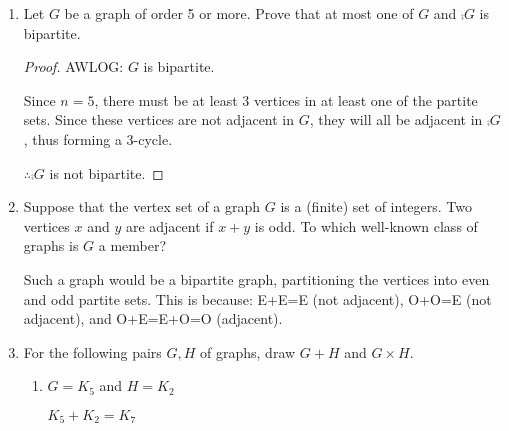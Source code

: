 \documentclass[letterpaper,12pt,fleqn]{article}
\begin{document}
\begin{enumerate}[start=21]
\item Let \(G\) be a graph of order 5 or more.  Prove that at most one of \(G\) and \(\comp{G}\) is bipartite.

  \begin{proof}
    AWLOG: \(G\) is bipartite.

    Since \(n=5\), there must be at least 3 vertices in at least one of the partite sets.  Since these vertices are
    not adjacent in \(G\), they will all be adjacent in \(\comp{G}\), thus forming a 3-cycle.

    \(\therefore\comp{G}\) is not bipartite.
  \end{proof}
  
\item Suppose that the vertex set of a graph \(G\) is a (finite) set of integers.  Two vertices \(x\) and \(y\) are
  adjacent if \(x+y\) is odd.  To which well-known class of graphs is \(G\) a member?

  Such a graph would be a bipartite graph, partitioning the vertices into even and odd partite sets.  This is
  because: E+E=E (not adjacent), O+O=E (not adjacent), and O+E=E+O=O (adjacent).

\item For the following pairs \(G,H\) of graphs, draw \(G+H\) and \(G\times H\).
  \begin{enumerate}
  \item \(G=K_5\) and \(H=K_2\)

    \bigskip

    \begin{minipage}{1.5in}
      \begin{center}

        \bigskip

        \(K_5+K_2=K_7\)
      \end{center}
    \end{minipage}
    \begin{minipage}{4in}
      \begin{center}


\end{center}
\end{minipage}
\end{enumerate}
\end{enumerate}
\end{document}
